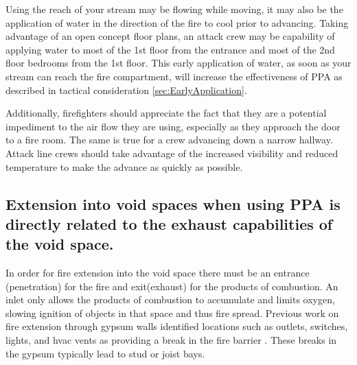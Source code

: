 \documentclass{article}
\begin{document}
Using the reach of your stream may be flowing while moving, it may also be the application of water in the direction of the fire to cool prior to advancing. Taking advantage of an open concept floor plans, an attack crew may be capability of applying water to most of the 1st floor from the entrance and most of the 2nd floor bedrooms from the 1st floor.  This early application of water, as soon as your stream can reach the fire compartment, will increase the effectiveness of PPA as described in tactical consideration \ref{sec:EarlyApplication}.

Additionally, firefighters should appreciate the fact that they are a potential impediment to the air flow they are using, especially as they approach the door to a fire room. The same is true for a crew advancing down a narrow hallway. Attack line crews should take advantage of the increased visibility and reduced temperature to make the advance as quickly as possible.

\subsection{Extension into void spaces when using PPA is directly related to the exhaust capabilities of the void space.} \label{TC:Extension_Into_Voids}
In order for fire extension into the void space there must be an entrance (penetration) for the fire and exit(exhaust) for the products of combustion. An inlet only allows the products of combustion to accumulate and limits oxygen, slowing ignition of objects in that space and thus fire spread. Previous work on fire extension through gypsum walls identified locations such as outlets, switches, lights, and hvac vents as providing a break in the fire barrier\cite{DHS2011} \cite{WeinschenkStrongVentFlowFires}.  These breaks in the gypsum typically lead to stud or joist bays. 
\end{document}
